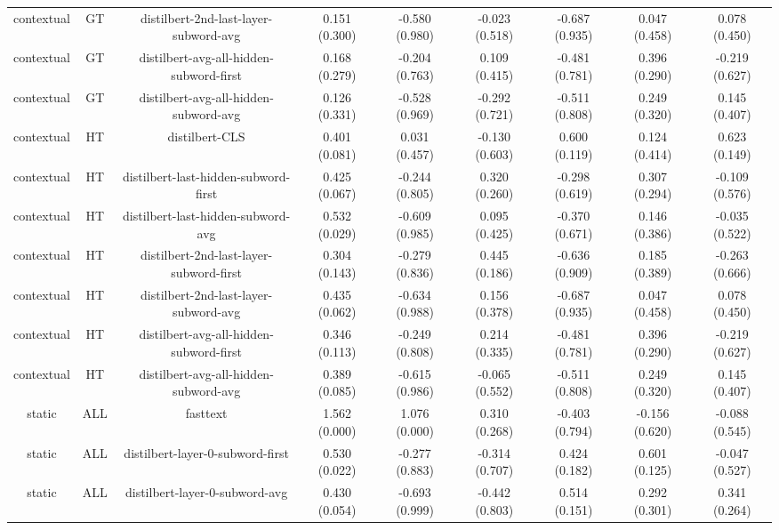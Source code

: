 \begin{sidewaystable}[htb]
\begin{tabular}{@{}ccccccccc@{}}
        contextual & GT & distilbert-2nd-last-layer-subword-avg & 0.151 (0.300) & -0.580 (0.980) & -0.023 (0.518) & -0.687 (0.935) & 0.047 (0.458) & 0.078 (0.450) \\
        contextual & GT & distilbert-avg-all-hidden-subword-first & 0.168 (0.279) & -0.204 (0.763) & 0.109 (0.415) & -0.481 (0.781) & 0.396 (0.290) & -0.219 (0.627) \\
        contextual & GT & distilbert-avg-all-hidden-subword-avg & 0.126 (0.331) & -0.528 (0.969) & -0.292 (0.721) & -0.511 (0.808) & 0.249 (0.320) & 0.145 (0.407) \\
        contextual & HT & distilbert-CLS & 0.401 (0.081) & 0.031 (0.457) & -0.130 (0.603) & 0.600 (0.119) & 0.124 (0.414) & 0.623 (0.149) \\
        contextual & HT & distilbert-last-hidden-subword-first & 0.425 (0.067) & -0.244 (0.805) & 0.320 (0.260) & -0.298 (0.619) & 0.307 (0.294) & -0.109 (0.576) \\
        contextual & HT & distilbert-last-hidden-subword-avg & 0.532 (0.029) & -0.609 (0.985) & 0.095 (0.425) & -0.370 (0.671) & 0.146 (0.386) & -0.035 (0.522) \\
        contextual & HT & distilbert-2nd-last-layer-subword-first & 0.304 (0.143) & -0.279 (0.836) & 0.445 (0.186) & -0.636 (0.909) & 0.185 (0.389) & -0.263 (0.666) \\
        contextual & HT & distilbert-2nd-last-layer-subword-avg & 0.435 (0.062) & -0.634 (0.988) & 0.156 (0.378) & -0.687 (0.935) & 0.047 (0.458) & 0.078 (0.450) \\
        contextual & HT & distilbert-avg-all-hidden-subword-first & 0.346 (0.113) & -0.249 (0.808) & 0.214 (0.335) & -0.481 (0.781) & 0.396 (0.290) & -0.219 (0.627) \\
        contextual & HT & distilbert-avg-all-hidden-subword-avg & 0.389 (0.085) & -0.615 (0.986) & -0.065 (0.552) & -0.511 (0.808) & 0.249 (0.320) & 0.145 (0.407) \\
        static & ALL & fasttext & 1.562 (0.000) & 1.076 (0.000) & 0.310 (0.268) & -0.403 (0.794) & -0.156 (0.620) & -0.088 (0.545) \\
        static & ALL & distilbert-layer-0-subword-first & 0.530 (0.022) & -0.277 (0.883) & -0.314 (0.707) & 0.424 (0.182) & 0.601 (0.125) & -0.047 (0.527) \\
        static & ALL & distilbert-layer-0-subword-avg & 0.430 (0.054) & -0.693 (0.999) & -0.442 (0.803) & 0.514 (0.151) & 0.292 (0.301) & 0.341 (0.264) \\

\end{tabular}
\end{sidewaystable}
